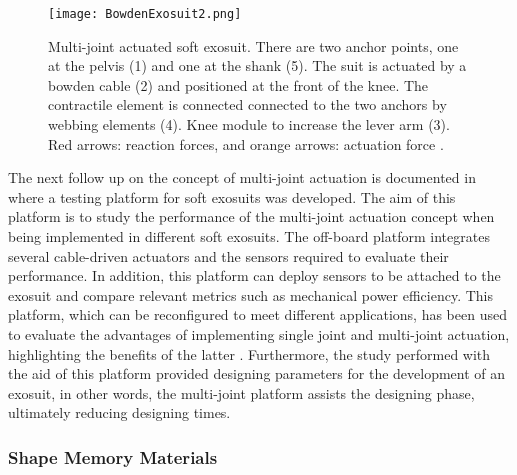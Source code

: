\begin{figure}[hbt!]
    \centering
    \texttt{[image: BowdenExosuit2.png]}
    \caption[Multi-joint actuated soft exosuit. There are two anchor points, one at the pelvis (1) and one at the shank (5). The suit is actuated by a bowden cable (2) and positioned at the front of the knee. The contractile element is connected connected to the two anchors by webbing elements (4). Knee module to increase the lever arm (3). Red arrows: reaction forces, and orange arrows: actuation force.]{Multi-joint actuated soft exosuit. There are two anchor points, one at the pelvis (1) and one at the shank (5). The suit is actuated by a bowden cable (2) and positioned at the front of the knee. The contractile element is connected connected to the two anchors by webbing elements (4). Knee module to increase the lever arm (3). Red arrows: reaction forces, and orange arrows: actuation force \cite{Bartenbach2015}. }
    \label{fig:bowden_exo2}
\end{figure}

The next follow up on the concept of multi-joint actuation is documented in \cite{Ding2014} where a testing platform for soft exosuits was developed. The aim of this platform is to study the performance of the multi-joint actuation concept when being implemented in different soft exosuits. The off-board platform integrates several cable-driven actuators and the sensors required to evaluate their performance. In addition, this platform can deploy sensors to be attached to the exosuit and compare relevant metrics such as mechanical power efficiency. This platform, which can be reconfigured to meet different applications, has been used to evaluate the advantages of implementing single joint and multi-joint actuation, highlighting the benefits of the latter \cite{Ding2016}. Furthermore, the study performed with the aid of this platform provided designing parameters for the development of an exosuit, in other words, the multi-joint platform assists the designing phase, ultimately reducing designing times.

\subsubsection{Shape Memory Materials}

